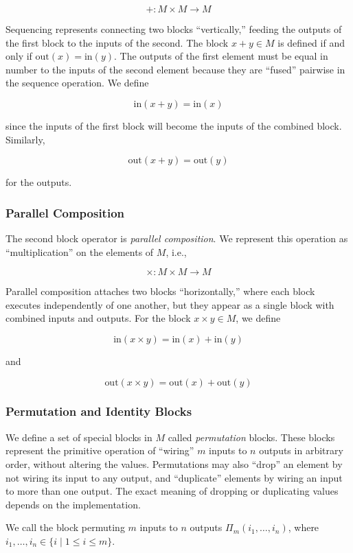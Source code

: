 \[
+ : M \times M \to M
\]

Sequencing represents connecting two blocks ``vertically,''
feeding the outputs of the first block to the inputs of the
second. The block $x+y \in M$ is defined if and only if
$\mbox{out}(x) = \mbox{in}(y)$. The outputs of the first element
must be equal in number to the inputs of the second element
because they are ``fused'' pairwise in the sequence operation. We
define

\[
\mbox{in}(x+y) = \mbox{in}(x)
\]

since the inputs of the first block will become the inputs of the
combined block. Similarly,

\[
\mbox{out}(x+y) = \mbox{out}(y)
\]

for the outputs.

\subsubsection{Parallel Composition}

The second block operator is \emph{parallel composition}. We
represent this operation as ``multiplication'' on the elements of
$M$, i.e.,

\[
\times : M \times M \to M
\]

Parallel composition attaches two blocks ``horizontally,'' where
each block executes independently of one another, but they appear
as a single block with combined inputs and outputs. For the block
$x\times y \in M$, we define

\[
\mbox{in} (x \times y) = \mbox{in}(x)+\mbox{in}(y)
\]

and

\[
\mbox{out}(x \times y) = \mbox{out}(x) + \mbox{out}(y)
\]

\subsubsection{Permutation and Identity Blocks}
\label{sec:code-gen:special}

We define a set of special blocks in $M$ called \emph{permutation}
blocks. These blocks represent the primitive operation of
``wiring'' $m$ inputs to $n$ outputs in arbitrary order, without
altering the values. Permutations may also ``drop'' an element by
not wiring its input to any output, and ``duplicate'' elements by
wiring an input to more than one output. The exact meaning of
dropping or duplicating values depends on the implementation.

We call the block permuting $m$ inputs to $n$ outputs
$\Pi_m(i_1,\ldots,i_n)$, where $i_1,\ldots,i_n \in \lbrace i \;|\;
1 \leq i \leq m \rbrace$.

